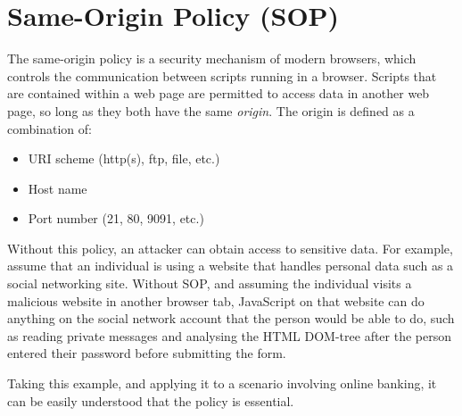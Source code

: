 \chapter{Same-Origin Policy (SOP)}

The same-origin policy is a security mechanism of modern browsers, which
controls the communication between scripts running in a browser. Scripts that
are contained within a web page are permitted to access data in another web
page, so long as they both have the same \emph{origin}. The origin is defined
as a combination of:
\begin{itemize}
	\item{URI scheme (http(s), ftp, file, etc.)}
	\item{Host name}
	\item{Port number (21, 80, 9091, etc.)}
\end{itemize}

Without this policy, an attacker can obtain access to sensitive data. For
example, assume that an individual is using a website that handles personal data
such as a social networking site. Without SOP, and assuming the individual
visits a malicious website in another browser tab, JavaScript on that website
can do anything on the social network account that the person would be able to
do, such as reading private messages and analysing the HTML DOM-tree after
the person entered their password before submitting the form.

Taking this example, and applying it to a scenario involving online banking, it
can be easily understood that the policy is essential.
